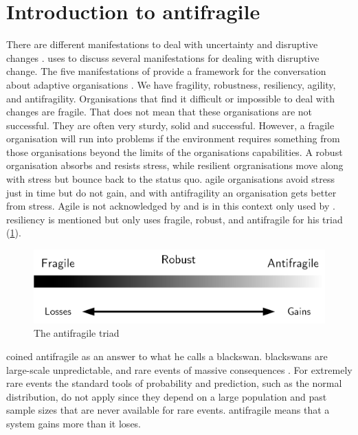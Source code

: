 \section{Introduction to antifragile}
\label{sec:introantifragility}
There are different manifestations to deal with uncertainty and disruptive changes \parencite[pp.~79--81]{Steen2018}. \Textcite{Steen2018} uses \textcite{Taleb2012} to discuss several manifestations for dealing with disruptive change. The five manifestations of \textcite{Taleb2012} provide a framework for the conversation about adaptive organisations \parencite[pp.~79--81]{Steen2018}. We have \gls{fragility}, \gls{robustness}, \gls{resiliency}, \gls{agility}, and \gls{antifragility}. Organisations that find it difficult or impossible to deal with changes are fragile. That does not mean that these organisations are not successful. They are often very sturdy, solid and successful. However, a fragile organisation will run into problems if the environment requires something from those organisations beyond the limits of the organisations capabilities. A \gls{robust} organisation absorbs and resists stress, while \gls{resilient} orgranisations move along with stress but bounce back to the status quo. \Gls{agile} organisations avoid stress just in time but do not gain, and with \gls{antifragility} an organisation gets better from stress. Agile is not acknowledged by \textcite{Taleb2012} and is in this context only used by \textcite{Steen2018}. \Gls{resiliency} is mentioned but \textcite{Taleb2012} only uses \gls{fragile}, \gls{robust}, and \gls{antifragile} for his \gls{triad} (\cref{fig:antifragilesimple}).
\begin{figure}[H]
	\centering
	\includegraphics[width=0.6\linewidth]{images/antifragilesimple}
	\caption[The antifragile triad]{The antifragile triad}
	\label{fig:antifragilesimple}
\end{figure}
\textcite{Taleb2012} coined \gls{antifragile} as an answer to what he calls a \gls{blackswan}. \Glspl{blackswan} are large-scale unpredictable, and rare events of massive consequences \parencite[p.~6]{Taleb2012}. For extremely rare events the standard tools of probability and prediction, such as the normal distribution, do not apply since they depend on a large population and past sample sizes that are never available for rare events. \Gls{antifragile} means that a system gains more than it loses. 

